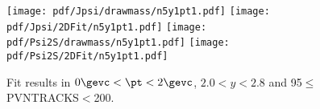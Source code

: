 \begin{figure}[H]
\begin{center}
\texttt{[image: pdf/Jpsi/drawmass/n5y1pt1.pdf]}
\texttt{[image: pdf/Jpsi/2DFit/n5y1pt1.pdf]}
\vspace*{-0.5cm}
\texttt{[image: pdf/Psi2S/drawmass/n5y1pt1.pdf]}
\texttt{[image: pdf/Psi2S/2DFit/n5y1pt1.pdf]}
\vspace*{-0.5cm}
\end{center}
\caption{Fit results in $0\gevc<\pt<2\gevc$, $2.0<y<2.8$ and 95$\leq$PVNTRACKS$<$200.}
\label{Fitn5y1pt1}
\end{figure}
